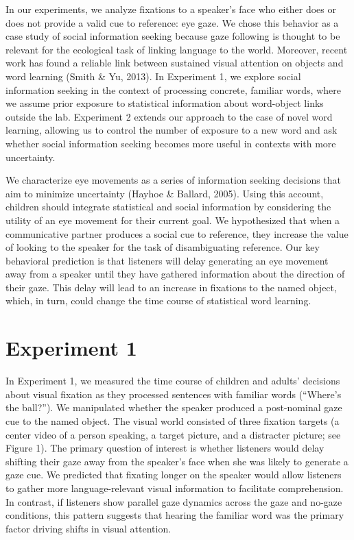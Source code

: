 \documentclass[10pt, letterpaper]{article}
\begin{document}
In our experiments, we analyze fixations to a speaker's face who either
does or does not provide a valid cue to reference: eye gaze. We chose
this behavior as a case study of social information seeking because gaze
following is thought to be relevant for the ecological task of linking
language to the world. Moreover, recent work has found a reliable link
between sustained visual attention on objects and word learning (Smith
\& Yu, 2013). In Experiment 1, we explore social information seeking in
the context of processing concrete, familiar words, where we assume
prior exposure to statistical information about word-object links
outside the lab. Experiment 2 extends our approach to the case of novel
word learning, allowing us to control the number of exposure to a new
word and ask whether social information seeking becomes more useful in
contexts with more uncertainty.

We characterize eye movements as a series of information seeking
decisions that aim to minimize uncertainty (Hayhoe \& Ballard, 2005).
Using this account, children should integrate statistical and social
information by considering the utility of an eye movement for their
current goal. We hypothesized that when a communicative partner produces
a social cue to reference, they increase the value of looking to the
speaker for the task of disambiguating reference. Our key behavioral
prediction is that listeners will delay generating an eye movement away
from a speaker until they have gathered information about the direction
of their gaze. This delay will lead to an increase in fixations to the
named object, which, in turn, could change the time course of
statistical word learning.

\hypertarget{experiment-1}{%
\section{Experiment 1}\label{experiment-1}}

In Experiment 1, we measured the time course of children and adults'
decisions about visual fixation as they processed sentences with
familiar words (``Where's the ball?''). We manipulated whether the
speaker produced a post-nominal gaze cue to the named object. The visual
world consisted of three fixation targets (a center video of a person
speaking, a target picture, and a distracter picture; see Figure 1). The
primary question of interest is whether listeners would delay shifting
their gaze away from the speaker's face when she was likely to generate
a gaze cue. We predicted that fixating longer on the speaker would allow
listeners to gather more language-relevant visual information to
facilitate comprehension. In contrast, if listeners show parallel gaze
dynamics across the gaze and no-gaze conditions, this pattern suggests
that hearing the familiar word was the primary factor driving shifts in
visual attention.
\end{document}
